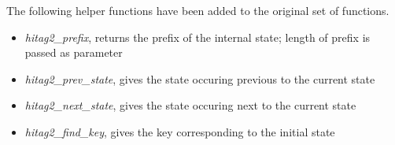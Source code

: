 The following helper functions have been added to the original set of functions.
\begin{itemize}
\item \textit{hitag2\_prefix}, returns the prefix of the internal state; length of prefix is passed as parameter
\item \textit{hitag2\_prev\_state}, gives the state occuring previous to the current state
\item \textit{hitag2\_next\_state}, gives the state occuring next to the current state
\item \textit{hitag2\_find\_key}, gives the key corresponding to the initial state
\end{itemize}
